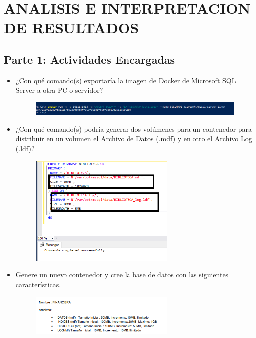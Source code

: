 \section{ANALISIS E INTERPRETACION DE RESULTADOS} 


\subsection{Parte 1: Actividades Encargadas}
	\begin{itemize}
		\item ¿Con qué comando(s) exportaría la imagen de Docker de Microsoft SQL Server a otra PC o servidor?
                      \begin{figure}[H]
		\begin{center}
		\includegraphics[width=15cm]{./Imagenes/6}
		\end{center}
		\end{figure} 
		\item ¿Con qué comando(s) podría generar dos volúmenes para un contenedor para distribuir en un volumen el Archivo de Datos (.mdf) y en otro el Archivo Log (.ldf)? 
                     \begin{figure}[H]
		\begin{center}
		\includegraphics[width=7cm]{./Imagenes/18}
		\end{center}
		\end{figure} 
		\item Genere un nuevo contenedor y cree la base de datos con las siguientes características.
                      \begin{figure}[H]
		\begin{center}
		\includegraphics[width=7cm]{./Imagenes/30}

\end{center}
\end{figure}
\end{itemize}
